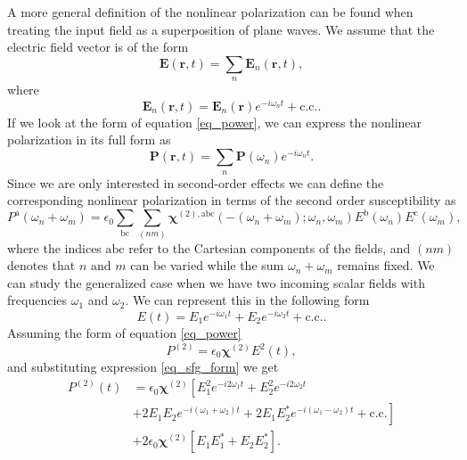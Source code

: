 A more general definition of the nonlinear polarization can be found when
treating the input field as a superposition of plane waves. We assume that the
electric field vector is of the form
\begin{equation}
\mathbf{E}(\mathbf{r},t) = \sum_{n}\mathbf{E}_{n}(\mathbf{r},t),
\end{equation}
where
\begin{equation}
\mathbf{E}_{n}(\mathbf{r},t)
= \mathbf{E}_{n}(\mathbf{r})e^{-i\omega_{n}t} + \text{c.c.}.
\end{equation}
If we look at the form of equation \eqref{eq_power}, we can express the
nonlinear polarization in its full form as
\begin{equation}
\mathbf{P}(\mathbf{r},t) = \sum_{n}\mathbf{P}(\omega_{n})e^{-i\omega_{n}t}.
\end{equation}
Since we are only interested in second-order effects we can define the
corresponding nonlinear polarization in terms of the second order susceptibility
as
\begin{equation}
P^{\mathrm{a}}(\omega_{n} + \omega_{m})
= \epsilon_{0}\sum_{\mathrm{bc}}\sum_{(nm)}
\boldsymbol{\chi}^{(2),\mathrm{abc}}(-(\omega_{n}+\omega_{m});\omega_{n},\omega_{m})
E^{\mathrm{b}}(\omega_{n})E^{\mathrm{c}}(\omega_{m}),\label{eq_nonlin_p}
\end{equation}
where the indices $\mathrm{abc}$ refer to the Cartesian components of the
fields, and $(nm)$ denotes that $n$ and $m$ can be varied while the sum
$\omega_{n} + \omega_{m}$ remains fixed. We can study the generalized case when
we have two incoming scalar fields with frequencies $\omega_{1}$ and
$\omega_{2}$. We can represent this in the following form
\begin{equation}
E(t) = E_{1}e^{-i\omega_{1}t} + E_{2}e^{-i\omega_{2}t}
     + \text{c.c.}.\label{eq_sfg_form}
\end{equation}
Assuming the form of equation \eqref{eq_power}
\begin{equation}
P^{(2)} = \epsilon_{0}\boldsymbol{\chi}^{(2)}E^{2}(t),
\end{equation}
and substituting expression \eqref{eq_sfg_form} we get
\begin{align}
P^{(2)}(t)
&= \epsilon_{0}\boldsymbol{\chi}^{(2)}\left[E^{2}_{1}e^{-i2\omega_{1}t}
 + E^{2}_{2}e^{-i2\omega_{2}t}\right.\nonumber\\
&+ \left. 2E_{1}E_{2}e^{-i(\omega_{1}+\omega_{2})t}
 + 2E_{1}E^{\ast}_{2}e^{-i(\omega_{1}-\omega_{2})t}
 + \text{c.c.}\right]\nonumber\\
&+ 2\epsilon_{0}\boldsymbol{\chi}^{(2)}\left[E_{1}E^{\ast}_{1}
 + E_{2}E^{\ast}_{2}\right].\label{eq_second_order}
\end{align}
